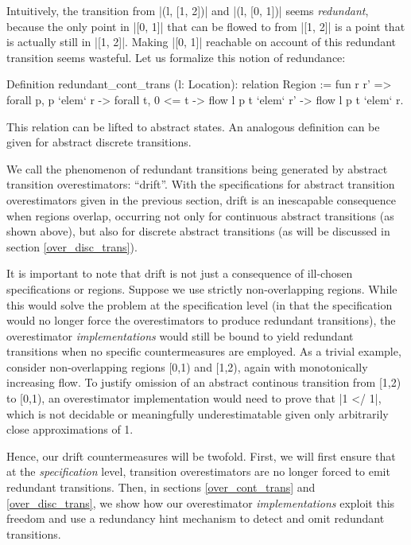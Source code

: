 \documentclass[runningheads]{llncs}
\begin{document}
{Intuitively, the transition from |(l, [1, 2])| and |(l, [0, 1])| seems \emph{redundant}, because the only point in |[0, 1]| that can be flowed to from |[1, 2]| is a point that is actually still in |[1, 2]|. Making |[0, 1]| reachable on account of this redundant transition seems wasteful. Let us formalize this notion of redundance:
\begin{code}
  Definition redundant_cont_trans (l: Location): relation Region
    := fun r r' => forall p, p `elem` r -> forall t, 0 <= t -> flow l p t `elem` r' -> flow l p t `elem` r.
\end{code}
This relation can be lifted to abstract states. An analogous definition can be given for abstract discrete transitions.


We call the phenomenon of redundant transitions being generated by abstract transition overestimators: ``drift''. With the specifications for abstract transition overestimators given in the previous section, drift is an inescapable consequence when regions overlap, occurring not only for continuous abstract transitions (as shown above), but also for discrete abstract transitions (as will be discussed in section \ref{over_disc_trans}).

It is important to note that drift is not just a consequence of ill-chosen specifications or regions. Suppose we use strictly non-overlapping regions. While this would solve the problem at the specification level (in that the specification would no longer force the overestimators to produce redundant transitions), the overestimator \emph{implementations} would still be bound to yield redundant transitions when no specific countermeasures are employed. As a trivial example, consider non-overlapping regions [0,1) and [1,2), again with monotonically increasing flow. To justify omission of an abstract continous transition from [1,2) to [0,1), an overestimator implementation would need to prove that |1 </ 1|, which is not decidable or meaningfully underestimatable given only arbitrarily close approximations of 1.

Hence, our drift countermeasures will be twofold. First, we will first ensure that at the \emph{specification} level, transition overestimators are no longer forced to emit redundant transitions. Then, in sections \ref{over_cont_trans} and \ref{over_disc_trans}, we show how our overestimator \emph{implementations} exploit this freedom and use a redundancy hint mechanism to detect and omit redundant transitions.

}
\end{document}
